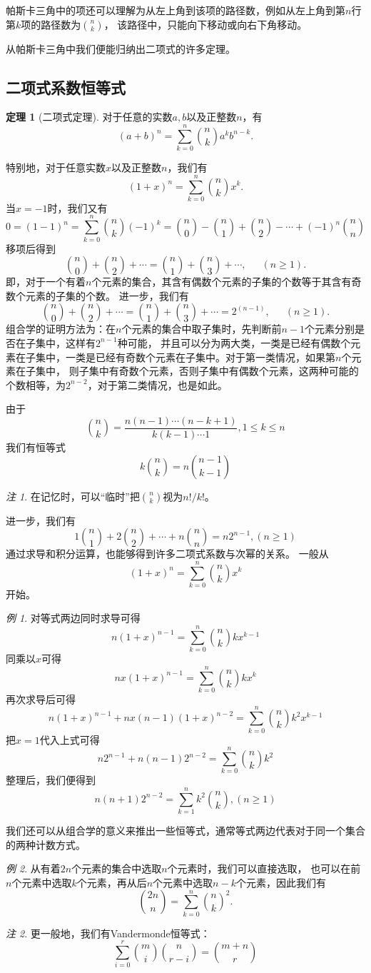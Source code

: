 \documentclass[a4paper,11pt]{article}%
\theoremstyle{remark}
\newtheorem*{remark}{注}
\theoremstyle{remark}
\newtheorem*{example}{例}
\theoremstyle{definition}
\newtheorem{theorem}{定理}[section]
\theoremstyle{definition}
\theoremstyle{definition}
\begin{document}
帕斯卡三角中的项还可以理解为从左上角到该项的路径数，例如从左上角到第$n$行第$k$项的路径数为$\binom{n}{k}$，
该路径中，只能向下移动或向右下角移动。

从帕斯卡三角中我们便能归纳出二项式的许多定理。
\subsection{二项式系数恒等式}
\begin{theorem}[二项式定理]
    对于任意的实数$a,b$以及正整数$n$，有
    \[(a+b)^n=\sum_{k=0}^n\binom{n}{k}a^kb^{n-k}.\]
\end{theorem}
特别地，对于任意实数$x$以及正整数$n$，我们有
\[(1+x)^n=\sum_{k=0}^n\binom{n}{k}x^k.\]
当$x=-1$时，我们又有
\[0=(1-1)^n=\sum_{k=0}^n\binom{n}{k}(-1)^k=\binom{n}{0}-\binom{n}{1}+\binom{n}{2}-\cdots+(-1)^n\binom{n}{n}\]
移项后得到
\[\binom{n}{0}+\binom{n}{2}+\cdots=\binom{n}{1}+\binom{n}{3}+\cdots,\phantom{111}(n\geq 1).\]
即，对于一个有着$n$个元素的集合，其含有偶数个元素的子集的个数等于其含有奇数个元素的子集的个数。
进一步，我们有
\[\binom{n}{0}+\binom{n}{2}+\cdots=\binom{n}{1}+\binom{n}{3}+\cdots=2^{(n-1)},\phantom{111}(n\geq 1).\]
组合学的证明方法为：在$n$个元素的集合中取子集时，先判断前$n-1$个元素分别是否在子集中，这样有$2^{n-1}$种可能，
并且可以分为两大类，一类是已经有偶数个元素在子集中，一类是已经有奇数个元素在子集中。对于第一类情况，如果第$n$个元素在子集中，
则子集中有奇数个元素，否则子集中有偶数个元素，这两种可能的个数相等，为$2^{n-2}$，对于第二类情况，也是如此。

由于 
\[\binom{n}{k}=\frac{n(n-1)\cdots(n-k+1)}{k(k-1)\cdots 1},1\leq k\leq n\]
我们有恒等式
\[k\binom{n}{k}=n\binom{n-1}{k-1}\]
\begin{remark}
    在记忆时，可以“临时”把$\binom{n}{k}$视为$n!/k!$。
\end{remark}
进一步，我们有
\[1\binom{n}{1}+2\binom{n}{2}+\cdots+n\binom{n}{n}=n2^{n-1},(n\geq 1)\]
通过求导和积分运算，也能够得到许多二项式系数与次幂的关系。
一般从
\[(1+x)^n=\sum_{k=0}^n\binom{n}{k}x^k\]
开始。

\begin{example}
    对等式两边同时求导可得
    \[n(1+x)^{n-1}=\sum_{k=0}^n\binom{n}{k}kx^{k-1}\]
    同乘以$x$可得
    \[nx(1+x)^{n-1}=\sum_{k=0}^n\binom{n}{k}kx^k\]
    再次求导后可得
    \[n(1+x)^{n-1}+nx(n-1)(1+x)^{n-2}=\sum_{k=0}^n\binom{n}{k}k^2x^{k-1}\]
    把$x=1$代入上式可得
    \[n2^{n-1}+n(n-1)2^{n-2}=\sum_{k=0}^n\binom{n}{k}k^2\]
    整理后，我们便得到
    \[n(n+1)2^{n-2}=\sum_{k=1}^nk^2\binom{n}{k},(n\geq 1)\]
\end{example}
我们还可以从组合学的意义来推出一些恒等式，通常等式两边代表对于同一个集合的两种计数方式。
\begin{example}
    从有着$2n$个元素的集合中选取$n$个元素时，我们可以直接选取，
    也可以在前$n$个元素中选取$k$个元素，再从后$n$个元素中选取$n-k$个元素，因此我们有
    \[\binom{2n}{n}=\sum_{k=0}^n\binom{n}{k}^2.\]
\end{example}
\begin{remark}
    更一般地，我们有Vandermonde恒等式：
    \[\sum_{i=0}^{r}\binom{m}{i}\binom{n}{r-i}=\binom{m+n}{r}\]
\end{remark}
\end{document}
